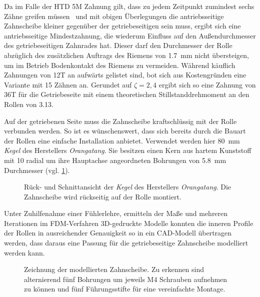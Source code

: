 		Da im Falle der HTD 5M Zahnung gilt, dass zu jedem Zeitpunkt zumindest sechs Zähne greifen müssen~\cite{MAEDLERGmbH.2021} und mit obigen Überlegungen die antriebsseitige Zahnscheibe kleiner gegenüber der getriebeseitigen sein muss, ergibt sich eine antriebsseitige Mindestzahnung, die wiederum Einfluss auf den Außendurchmesser des getriebeseitigen Zahnrades hat.
		Dieser darf den Durchmesser der Rolle abzüglich des zusätzlichen Auftrags des Riemens von \qty{1,7}{\milli\metre}\cite{gates.catalogue.2021} nicht übersteigen, um im Betrieb Bodenkontakt des Riemens zu vermeiden.
		Während käuflich Zahnungen von 12T an aufwärts gelistet sind, bot sich aus Kostengründen eine Variante mit 15 Zähnen an.
		Gerundet auf \(\zeta=2,4\) ergibt sich so eine Zahnung von 36T für die Getriebeseite mit einem theoretischen Stillstanddrehmoment an den Rollen von \qty{3,13}{\newtonmetre}.
		
		Auf der getriebenen Seite muss die Zahnscheibe kraftschlüssig mit der Rolle verbunden werden.
		So ist es wünschenswert, dass sich bereits durch die Bauart der Rollen eine einfache Installation anbietet.
		Verwendet werden hier \qty{80}{\milli\metre} \textit{Kegel} des Herstellers \textit{Orangatang}.
		Sie besitzen einen Kern aus hartem Kunststoff mit 10 radial um ihre Hauptachse angeordneten Bohrungen von \qty{5,8}{\milli\metre} Durchmesser (vgl. \cref{fig:kegels}).
		\begin{figure}[h]
			\centering
			
			\caption[Rück- und Schnittansicht der \textit{Kegel} des Herstellers \textit{Orangatang}]{Rück- und Schnittansicht der \textit{Kegel} des Herstellers \textit{Orangatang}. Die Zahnscheibe wird rückseitig auf der Rolle montiert.}%
			\label{fig:kegels}
		\end{figure}
		Unter Zuhilfenahme einer Fühlerlehre, ermitteln der Maße und mehreren Iterationen im FDM-Verfahren 3D-gedruckte Modelle konnten die inneren Profile der Rollen in ausreichender Genauigkeit so in ein CAD-Modell übertragen werden, dass daraus eine Passung für die getriebeseitige Zahnscheibe modelliert werden kann.
		\begin{figure}[h]
			\centering
			
			\caption[Zeichnung der modellierten Zahnscheibe]{Zeichnung der modellierten Zahnscheibe. Zu erkennen sind alternierend fünf Bohrungen um jeweils M4 Schrauben aufnehmen zu können und fünf Führungsstifte für eine vereinfachte Montage.}%
			\label{fig:htd 5m driven}
		\end{figure}

